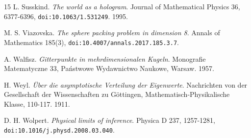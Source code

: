 \begin{thebibliography}{15}
L. Susskind. \emph{The world as a hologram}. Journal of Mathematical Physics 36, 6377-6396, \texttt{doi:10.1063/\allowbreak{}1.531249}. 1995.

M. S. Viazovska. \emph{The sphere packing problem in dimension 8}. Annals of Mathematics 185(3), \texttt{doi:10.4007/\allowbreak{}annals.2017.185.3.7}.

A. Walfisz. \emph{Gitterpunkte in mehrdimensionalen Kugeln}. Monografie Matematyczne 33, Państwowe Wydawnictwo Naukowe, Warsaw. 1957.

H. Weyl. \emph{Über die asymptotische Verteilung der Eigenwerte}. Nachrichten von der Gesellschaft der Wissenschaften zu Göttingen, Mathematisch-Physikalische Klasse, 110-117. 1911.

D. H. Wolpert. \emph{Physical limits of inference}. Physica D 237, 1257-1281, \texttt{doi:10.1016/\allowbreak{}j.physd.2008.03.040}.

\end{thebibliography}
